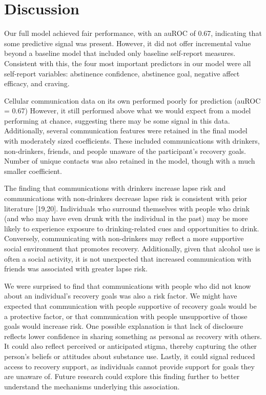 \documentclass[
  letterpaper,
  DIV=11,
  numbers=noendperiod]{scrartcl}
\begin{document}
\section{Discussion}\label{discussion}

Our full model achieved fair performance, with an auROC of 0.67,
indicating that some predictive signal was present. However, it did not
offer incremental value beyond a baseline model that included only
baseline self-report measures. Consistent with this, the four most
important predictors in our model were all self-report variables:
abstinence confidence, abstinence goal, negative affect efficacy, and
craving.

Cellular communication data on its own performed poorly for prediction
(auROC = 0.67) However, it still performed above what we would expect
from a model performing at chance, suggesting there may be some signal
in this data. Additionally, several communication features were retained
in the final model with moderately sized coefficients. These included
communications with drinkers, non-drinkers, friends, and people unaware
of the participant's recovery goals. Number of unique contacts was also
retained in the model, though with a much smaller coefficient.

The finding that communications with drinkers increase lapse risk and
communications with non-drinkers decrease lapse risk is consistent with
prior literature {[}19,20{]}. Individuals who surround themselves with
people who drink (and who may have even drunk with the individual in the
past) may be more likely to experience exposure to drinking-related cues
and opportunities to drink. Conversely, communicating with non-drinkers
may reflect a more supportive social environment that promotes recovery.
Additionally, given that alcohol use is often a social activity, it is
not unexpected that increased communication with friends was associated
with greater lapse risk.

We were surprised to find that communications with people who did not
know about an individual's recovery goals was also a risk factor. We
might have expected that communication with people supportive of
recovery goals would be a protective factor, or that communication with
people unsupportive of those goals would increase risk. One possible
explanation is that lack of disclosure reflects lower confidence in
sharing something as personal as recovery with others. It could also
reflect perceived or anticipated stigma, thereby capturing the other
person's beliefs or attitudes about substance use. Lastly, it could
signal reduced access to recovery support, as individuals cannot provide
support for goals they are unaware of. Future research could explore
this finding further to better understand the mechanisms underlying this
association.
\end{document}
